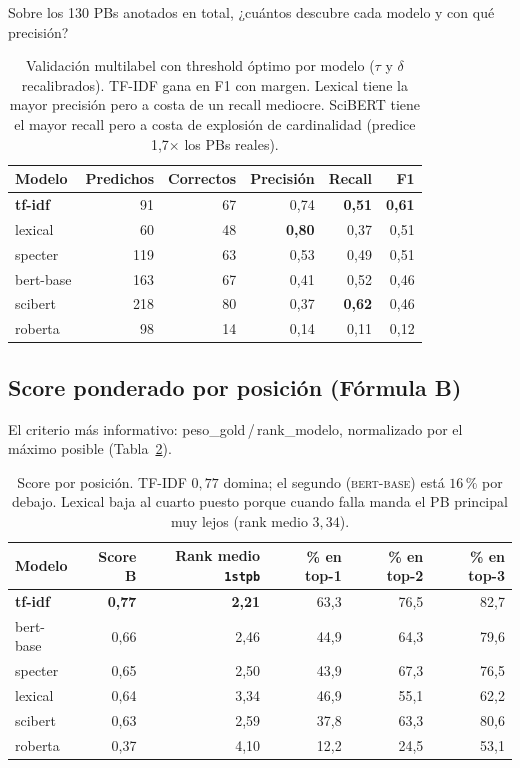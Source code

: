 \documentclass[11pt,a4paper]{article}
\newcommand{\good}[1]{\textbf{\textcolor{accent}{#1}}}
\begin{document}
Sobre los 130 PBs anotados en total, ¿cuántos descubre cada modelo y con qué precisión?

\begin{table}[h]
\centering
\small
\begin{tabular}{lrrrrr}
\toprule
\textbf{Modelo} & \textbf{Predichos} & \textbf{Correctos} & \textbf{Precisión} & \textbf{Recall} & \textbf{F1} \\
\midrule
\good{tf-idf} & 91 & 67 & 0{,}74 & \good{0{,}51} & \good{0{,}61} \\
lexical & 60 & 48 & \good{0{,}80} & 0{,}37 & 0{,}51 \\
specter & 119 & 63 & 0{,}53 & 0{,}49 & 0{,}51 \\
bert-base & 163 & 67 & 0{,}41 & 0{,}52 & 0{,}46 \\
scibert & 218 & 80 & 0{,}37 & \good{0{,}62} & 0{,}46 \\
roberta & 98 & 14 & 0{,}14 & 0{,}11 & 0{,}12 \\
\bottomrule
\end{tabular}
\caption{Validación multilabel con threshold óptimo por modelo ($\tau$ y $\delta$ recalibrados). TF-IDF gana en F1 con margen. Lexical tiene la mayor precisión pero a costa de un recall mediocre. SciBERT tiene el mayor recall pero a costa de explosión de cardinalidad (predice 1{,}7$\times$ los PBs reales).}
\label{tab:multi}
\end{table}

\subsection{Score ponderado por posición (Fórmula B)}

El criterio más informativo: peso\_gold\,/\,rank\_modelo, normalizado por el máximo posible (Tabla~\ref{tab:rank}).

\begin{table}[h]
\centering
\small
\begin{tabular}{lrrrrr}
\toprule
\textbf{Modelo} & \textbf{Score B} & \textbf{Rank medio} \texttt{1stpb} & \textbf{\% en top-1} & \textbf{\% en top-2} & \textbf{\% en top-3} \\
\midrule
\good{tf-idf} & \good{0{,}77} & \good{2{,}21} & 63{,}3 & 76{,}5 & 82{,}7 \\
bert-base & 0{,}66 & 2{,}46 & 44{,}9 & 64{,}3 & 79{,}6 \\
specter & 0{,}65 & 2{,}50 & 43{,}9 & 67{,}3 & 76{,}5 \\
lexical & 0{,}64 & 3{,}34 & 46{,}9 & 55{,}1 & 62{,}2 \\
scibert & 0{,}63 & 2{,}59 & 37{,}8 & 63{,}3 & 80{,}6 \\
roberta & 0{,}37 & 4{,}10 & 12{,}2 & 24{,}5 & 53{,}1 \\
\bottomrule
\end{tabular}
\caption{Score por posición. TF-IDF $0{,}77$ domina; el segundo (\textsc{bert-base}) está $16\,\%$ por debajo. Lexical baja al cuarto puesto porque cuando falla manda el PB principal muy lejos (rank medio $3{,}34$).}
\label{tab:rank}
\end{table}
\end{document}
